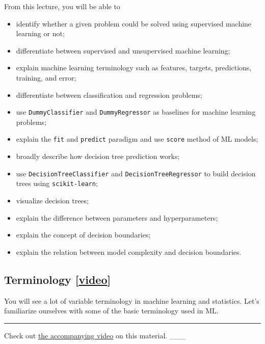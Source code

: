 \documentclass[11pt]{article}
\providecommand{\tightlist}{%
      \setlength{\itemsep}{0pt}\setlength{\parskip}{0pt}}
\begin{document}
From this lecture, you will be able to

\begin{itemize}
\tightlist
\item
  identify whether a given problem could be solved using supervised
  machine learning or not;
\item
  differentiate between supervised and unsupervised machine learning;
\item
  explain machine learning terminology such as features, targets,
  predictions, training, and error;
\item
  differentiate between classification and regression problems;
\item
  use \texttt{DummyClassifier} and \texttt{DummyRegressor} as baselines
  for machine learning problems;
\item
  explain the \texttt{fit} and \texttt{predict} paradigm and use
  \texttt{score} method of ML models;
\item
  broadly describe how decision tree prediction works;
\item
  use \texttt{DecisionTreeClassifier} and \texttt{DecisionTreeRegressor}
  to build decision trees using \texttt{scikit-learn};
\item
  visualize decision trees;
\item
  explain the difference between parameters and hyperparameters;
\item
  explain the concept of decision boundaries;
\item
  explain the relation between model complexity and decision boundaries.
\end{itemize}

    

    \subsection{\texorpdfstring{Terminology
{[}\href{https://youtu.be/YNT8n4cXu4A}{video}{]}}{Terminology {[}video{]}}}\label{terminology-video}

You will see a lot of variable terminology in machine learning and
statistics. Let's familiarize ourselves with some of the basic
terminology used in ML.

    \begin{center}\rule{0.5\linewidth}{0.5pt}\end{center}

Check out \href{https://youtu.be/YNT8n4cXu4A}{the accompanying video} on
this material. \_\_\_
\end{document}
